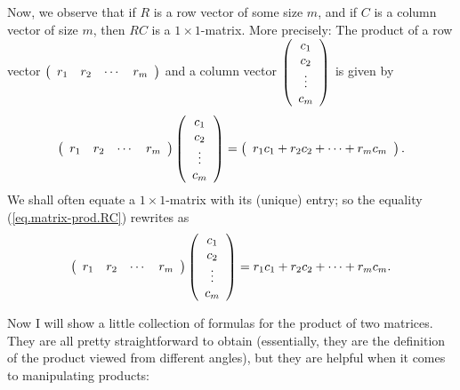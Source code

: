 \documentclass[numbers=enddot,12pt,final,onecolumn,notitlepage]{scrartcl}%
\theoremstyle{definition}
\begin{document}
Now, we observe that if $R$ is a row vector of some size $m$, and if $C$ is a
column vector of size $m$, then $RC$ is a $1\times1$-matrix. More precisely:
The product of a row vector $\left(
\begin{array}
[c]{cccc}%
r_{1} & r_{2} & \cdots & r_{m}%
\end{array}
\right)  $ and a column vector $\left(
\begin{array}
[c]{c}%
c_{1}\\
c_{2}\\
\vdots\\
c_{m}%
\end{array}
\right)  $ is given by
\begin{equation}
\left(
\begin{array}
[c]{cccc}%
r_{1} & r_{2} & \cdots & r_{m}%
\end{array}
\right)  \left(
\begin{array}
[c]{c}%
c_{1}\\
c_{2}\\
\vdots\\
c_{m}%
\end{array}
\right)  =\left(
\begin{array}
[c]{c}%
r_{1}c_{1}+r_{2}c_{2}+\cdots+r_{m}c_{m}%
\end{array}
\right)  . \label{eq.matrix-prod.RC}%
\end{equation}
We shall often equate a $1\times1$-matrix with its (unique) entry; so the
equality (\ref{eq.matrix-prod.RC}) rewrites as%
\begin{equation}
\left(
\begin{array}
[c]{cccc}%
r_{1} & r_{2} & \cdots & r_{m}%
\end{array}
\right)  \left(
\begin{array}
[c]{c}%
c_{1}\\
c_{2}\\
\vdots\\
c_{m}%
\end{array}
\right)  =r_{1}c_{1}+r_{2}c_{2}+\cdots+r_{m}c_{m}. \label{eq.matrix-prod.RC.1}%
\end{equation}


Now I will show a little collection of formulas for the product of two
matrices. They are all pretty straightforward to obtain (essentially, they are
the definition of the product viewed from different angles), but they are
helpful when it comes to manipulating products:
\end{document}
